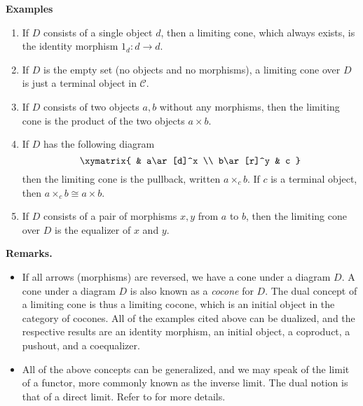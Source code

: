\documentclass[12pt]{article}
\begin{document}
\textbf{Examples}
\begin{enumerate}
\item If $D$ consists of a single object $d$, then a limiting cone, which always exists, is the identity morphism $1_d:d\to d$.
\item If $D$ is the empty set (no objects and no morphisms), a limiting cone over $D$ is just a terminal object in $\mathcal{C}$.
\item If $D$ consists of two objects $a,b$ without any morphisms, then the limiting cone is the product of the two objects $a\times b$.
\item If $D$ has the following diagram 
$$\xymatrix{
&  a\ar[d]^x \\
b\ar[r]^y & c
}$$
then the limiting cone is the pullback, written $a\times_c b$.  If $c$ is a terminal object, then $a\times_c b \cong a\times b$.
\item If $D$ consists of a pair of morphisms $x,y$ from $a$ to $b$, then the limiting cone over $D$ is the equalizer of $x$ and $y$.
\end{enumerate}

\textbf{Remarks.}  
\begin{itemize}
\item If all arrows (morphisms) are reversed, we have a cone under a diagram $D$.  A cone under a diagram $D$ is also known as a \emph{cocone} for $D$.  The dual concept of a limiting cone is thus a limiting cocone, which is an initial object in the category of cocones.  All of the examples cited above can be dualized, and the respective results are an identity morphism, an initial object, a coproduct, a pushout, and a coequalizer.
\item All of the above concepts can be generalized, and we may speak of the limit of a functor, more commonly known as the inverse limit.  The dual notion is that of a direct limit.  Refer to  for more details.
\end{itemize}
\end{document}
